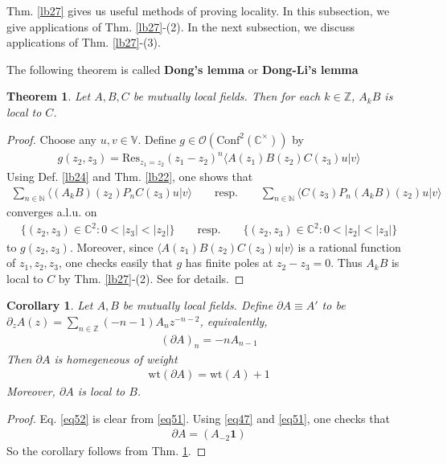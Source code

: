 \documentclass[12pt,b5paper,notitlepage]{article}
\theoremstyle{definition}
\theoremstyle{plain}
\newtheorem{thm}[df]{Theorem}
\newtheorem{co}[df]{Corollary}
\newcommand{\idt}{\mathbf{1}}
\newcommand{\Conf}{\mathrm{Conf}}
\newcommand{\Res}{\mathrm{Res}}
\newcommand{\bk}[1]{\langle {#1}\rangle}
\newcommand{\scr}{\mathscr}
\newcommand{\Vbb}{\mathbb V}
\newcommand{\Cbb}{\mathbb C}
\newcommand{\Nbb}{\mathbb N}
\newcommand{\Zbb}{\mathbb Z}
\newcommand{\wt}{\mathrm{wt}}
\numberwithin{equation}{section}
\begin{document}
Thm. \ref{lb27} gives us useful methods of proving locality. In this subsection, we give applications of Thm. \ref{lb27}-(2). In the next subsection, we discuss applications of Thm. \ref{lb27}-(3). 

The following theorem is called \textbf{Dong's lemma}  or \textbf{Dong-Li's lemma}


\begin{thm}\label{lb29}
Let $A,B,C$ be mutually local fields. Then for each $k\in\Zbb$, $A_kB$ is local to $C$.
\end{thm}

\begin{proof}
Choose any $u,v\in\Vbb$. Define $g\in\scr O(\Conf^2(\Cbb^\times))$ by
\begin{align*}
g(z_2,z_3)=\Res_{z_1=z_2}(z_1-z_2)^n\bk{A(z_1)B(z_2)C(z_3)u|v}
\end{align*}
Using Def. \ref{lb24} and Thm. \ref{lb22}, one shows that
\begin{align*}
\sum_{n\in\Nbb}\bk{(A_kB)(z_2)P_nC(z_3)u|v}\qquad\text{resp.}\qquad \sum_{n\in\Nbb}\bk{C(z_3)P_n(A_kB)(z_2)u|v}
\end{align*}
converges a.l.u. on
\begin{align*}
\{(z_2,z_3)\in\Cbb^2:0<|z_3|<|z_2|\}\qquad\text{resp.}\qquad\{(z_2,z_3)\in\Cbb^2:0<|z_2|<|z_3|\}
\end{align*}
to $g(z_2,z_3)$. Moreover, since $\bk{A(z_1)B(z_2)C(z_3)u|v}$ is a rational function of $z_1,z_2,z_3$, one checks easily that $g$ has finite poles at $z_2-z_3=0$. Thus $A_kB$ is local to $C$ by Thm. \ref{lb27}-(2). See \cite[Subsec. 8.7]{Gui-V} for details.
\end{proof}


\begin{co}
Let $A,B$ be mutually local fields. Define $\partial A\equiv A'$ to be $\partial_zA(z)=\sum_{n\in\Zbb}(-n-1)A_nz^{-n-2}$, equivalently,
\begin{align}\label{eq51}
(\partial A)_n=-nA_{n-1}
\end{align}
Then $\partial A$ is homegeneous of weight
\begin{align}\label{eq52}
\wt(\partial A)=\wt(A)+1
\end{align}
Moreover, $\partial A$ is local to $B$.
\end{co}

\begin{proof}
Eq. \eqref{eq52} is clear from \eqref{eq51}. Using \eqref{eq47} and \eqref{eq51}, one checks that
\begin{align}
\partial A=(A_{-2}\idt)
\end{align}
So the corollary follows from Thm. \ref{lb29}.
\end{proof}
\end{document}
